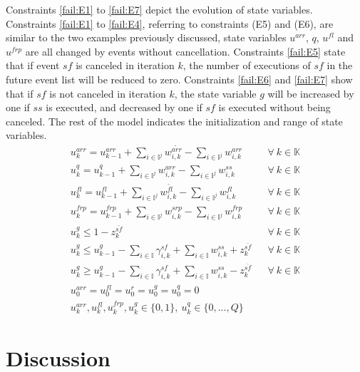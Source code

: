 \documentclass[]{interact}
\theoremstyle{plain}%
\theoremstyle{definition}
\theoremstyle{remark}
\begin{document}
Constraints \eqref{fail:E1} to \eqref{fail:E7} depict the evolution of state variables. Constraints \eqref{fail:E1} to \eqref{fail:E4}, referring to constraints (E5) and (E6), are similar to the two examples previously discussed, state variables $u^{arr}$, $q$, $u^{fl}$ and $u^{frp}$ are all changed by events without cancellation. Constraints \eqref{fail:E5} state that if event ${sf}$ is canceled in iteration $k$, the number of executions of ${sf}$ in the future event list will be reduced to zero. Constraints \eqref{fail:E6} and \eqref{fail:E7} show that if ${sf}$ is not canceled in iteration $k$, the state variable $g$ will be increased by one if ${ss}$ is executed, and decreased by one if ${sf}$ is executed without being canceled. The rest of the model indicates the initialization and range of state variables.
\begin{eqnarray}
u^{arr}_k=u^{arr}_{k-1}+ \sum_{i\in\mathbb{I}^j}w^{\tilde{arr}}_{i,k}-\sum_{i\in\mathbb{I}^j}w^{arr}_{i,k}&&\forall\ k\in \mathbb{K}\label{fail:E1}\\
u^{q}_k=u^{q}_{k-1}+ \sum_{i\in\mathbb{I}^j}w^{arr}_{i,k}-\sum_{i\in\mathbb{I}^j}w^{ss}_{i,k}&&\forall\ k\in \mathbb{K}\label{fail:E2}\\
u^{fl}_k=u^{fl}_{k-1}+ \sum_{i\in\mathbb{I}^j}w^{\tilde{fl}}_{i,k}-\sum_{i\in\mathbb{I}^j}w^{fl}_{i,k}&&\forall\ k\in \mathbb{K}\label{fail:E3}\\
u^{frp}_k=u^{frp}_{k-1}+ \sum_{i\in\mathbb{I}^j}w^{srp}_{i,k}-\sum_{i\in\mathbb{I}^j}w^{frp}_{i,k}&&\forall\ k\in \mathbb{K}\label{fail:E4}\\
u^{g}_k \le 1-z^{\bar{sf}}_{k}&&\forall\ k\in \mathbb{K}\label{fail:E5}\\
u^{g}_k\le u^{g}_{k-1}- \sum_{i\in \mathbb{I}} \gamma^{sf}_{i,k} +\sum_{i\in \mathbb{I}} w^{ss}_{i,k} + z^{\bar{sf}}_{k}&&\forall\ k\in \mathbb{K}\label{fail:E6}\\
u^{g}_k\ge u^{g}_{k-1}-  \sum_{i\in \mathbb{I}} \gamma^{sf}_{i,k} +\sum_{i\in \mathbb{I}} w^{ss}_{i,k}  - z^{\bar{sf}}_{k}&&\forall\ k\in \mathbb{K}\label{fail:E7}\\
u^{arr}_0=u^{fl}_0=u^{r}_0=u^{g}_0=u^{q}_0=0\nonumber\\
u^{arr}_k,u^{fl}_k,u^{frp}_k,u^{g}_k\in\{0,1\},\ u^{q}_k\in\{0,...,Q\}\nonumber
\end{eqnarray}


\section{Discussion}\label{sec:discussion}
\end{document}
